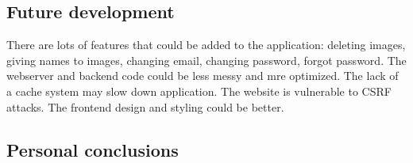 \documentclass[../documentation.tex]{subfiles}
\begin{document}
\subsection{Future development}

There are lots of features that could be added to the application:
deleting images, giving names to images, changing email,
changing password, forgot password.
The webserver and backend code could be less messy
and mre optimized.
The lack of a cache system may slow down application.
The website is vulnerable to CSRF attacks.
The frontend design and styling could be better.

\subsection{Personal conclusions}
\end{document}
